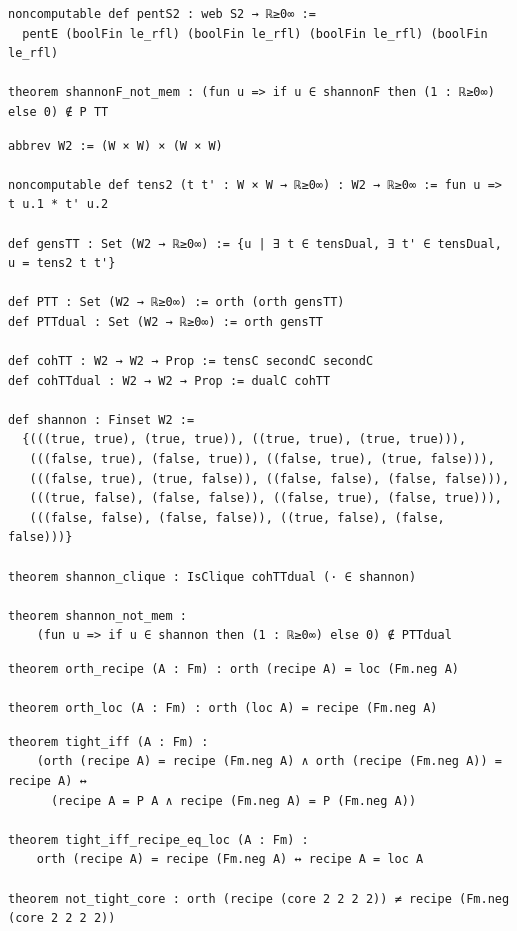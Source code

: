 \label{lean:shannon-not-mem}
\begin{lstlisting}
noncomputable def pentS2 : web S2 → ℝ≥0∞ :=
  pentE (boolFin le_rfl) (boolFin le_rfl) (boolFin le_rfl) (boolFin le_rfl)

theorem shannonF_not_mem : (fun u => if u ∈ shannonF then (1 : ℝ≥0∞) else 0) ∉ P TT
\end{lstlisting}

\label{lean:tensorgap-bool}
\begin{lstlisting}
abbrev W2 := (W × W) × (W × W)

noncomputable def tens2 (t t' : W × W → ℝ≥0∞) : W2 → ℝ≥0∞ := fun u => t u.1 * t' u.2

def gensTT : Set (W2 → ℝ≥0∞) := {u | ∃ t ∈ tensDual, ∃ t' ∈ tensDual, u = tens2 t t'}

def PTT : Set (W2 → ℝ≥0∞) := orth (orth gensTT)
def PTTdual : Set (W2 → ℝ≥0∞) := orth gensTT

def cohTT : W2 → W2 → Prop := tensC secondC secondC
def cohTTdual : W2 → W2 → Prop := dualC cohTT

def shannon : Finset W2 :=
  {(((true, true), (true, true)), ((true, true), (true, true))),
   (((false, true), (false, true)), ((false, true), (true, false))),
   (((false, true), (true, false)), ((false, false), (false, false))),
   (((true, false), (false, false)), ((false, true), (false, true))),
   (((false, false), (false, false)), ((true, false), (false, false)))}

theorem shannon_clique : IsClique cohTTdual (· ∈ shannon)

theorem shannon_not_mem :
    (fun u => if u ∈ shannon then (1 : ℝ≥0∞) else 0) ∉ PTTdual
\end{lstlisting}

\label{lean:orth-recipe}
\begin{lstlisting}
theorem orth_recipe (A : Fm) : orth (recipe A) = loc (Fm.neg A)

theorem orth_loc (A : Fm) : orth (loc A) = recipe (Fm.neg A)
\end{lstlisting}

\label{lean:tight}
\begin{lstlisting}
theorem tight_iff (A : Fm) :
    (orth (recipe A) = recipe (Fm.neg A) ∧ orth (recipe (Fm.neg A)) = recipe A) ↔
      (recipe A = P A ∧ recipe (Fm.neg A) = P (Fm.neg A))

theorem tight_iff_recipe_eq_loc (A : Fm) :
    orth (recipe A) = recipe (Fm.neg A) ↔ recipe A = loc A

theorem not_tight_core : orth (recipe (core 2 2 2 2)) ≠ recipe (Fm.neg (core 2 2 2 2))
\end{lstlisting}

